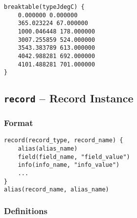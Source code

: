 \begin{verbatim}
breaktable(typeJdegC) {
    0.000000 0.000000
    365.023224 67.000000
    1000.046448 178.000000
    3007.255859 524.000000
    3543.383789 613.000000
    4042.988281 692.000000
    4101.488281 701.000000
}
\end{verbatim}

\subsection{\texttt{record} -- Record Instance}

\subsubsection{Format}

\begin{verbatim}
record(record_type, record_name) {
    alias(alias_name)
    field(field_name, "field_value")
    info(info_name, "info_value")
    ...
}
alias(record_name, alias_name)
\end{verbatim}

\subsubsection{Definitions}

